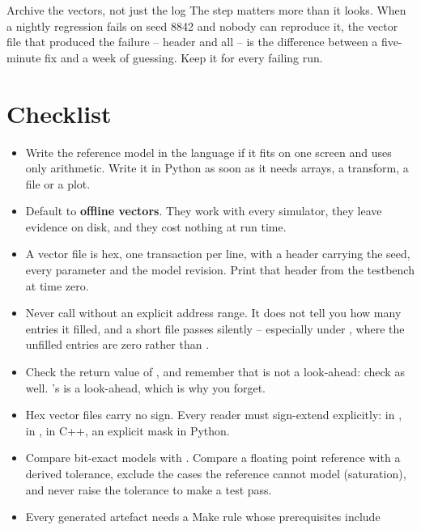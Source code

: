 \begin{notebox}{Archive the vectors, not just the log}
The  step matters more than it looks. When a nightly
regression fails on seed 8842 and nobody can reproduce it, the vector file
that produced the failure -- header and all -- is the difference between a
five-minute fix and a week of guessing. Keep it for every failing run.
\end{notebox}

\section{Checklist}
\label{sec:python:checklist}

\begin{itemize}
\item Write the reference model in the \RTL{} language if it fits on one
      screen and uses only arithmetic. Write it in Python as soon as it needs
      arrays, a transform, a file or a plot.
\item Default to \textbf{offline vectors}. They work with every simulator,
      they leave evidence on disk, and they cost nothing at run time.
\item A vector file is hex, one transaction per line, with a \code{//} header
      carrying the seed, every parameter and the model revision. Print that
      header from the testbench at time zero.
\item Never call  without an explicit address range. It does
      not tell you how many entries it filled, and a short file passes
      silently -- especially under , where the unfilled
      entries are zero rather than .
\item Check the return value of , and remember that
       is not a look-ahead: check  as well.
      \VHDL{}'s  is a look-ahead, which is why you forget.
\item Hex vector files carry no sign. Every reader must sign-extend
      explicitly:  in \SV{},  in \VHDL{},
       in C++, an explicit mask in Python.
\item Compare bit-exact models with \code{==}. Compare a floating point
      reference with a derived tolerance, exclude the cases the reference
      cannot model (saturation), and never raise the tolerance to make a test
      pass.
\item Every generated artefact needs a Make rule whose prerequisites include

\end{itemize}
